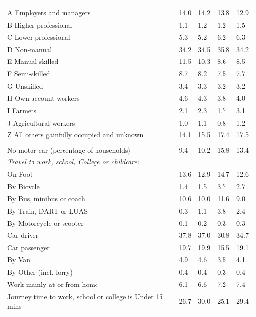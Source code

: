 \documentclass{article}
\begin{document}
\begin{table}[h]
\begin{tabular}{KTTTT}
\hline
    \\ 
    \hline
A Employers and managers & 14.0& 14.2& 13.8& 12.9\\
B Higher professional & 1.1& 1.2& 1.2& 1.5\\
C Lower professional & 5.3& 5.2& 6.2& 6.3\\
D Non-manual & 34.2& 34.5& 35.8& 34.2\\
E Manual skilled & 11.5& 10.3&  8.6&  8.5\\
F Semi-skilled & 8.7& 8.2& 7.5& 7.7\\
G Unskilled & 3.4& 3.3& 3.2& 3.2\\
H Own account workers & 4.6& 4.3& 3.8& 4.0\\
I Farmers & 2.1& 2.3& 1.7& 3.1\\
J Agricultural workers & 1.0& 1.1& 0.8& 1.2\\
Z All others gainfully occupied and unknown & 14.1& 15.5& 17.4& 17.5\\
\hline
{}\hline
    \\ 
    \hline
No motor car (percentage of households) &  9.4& 10.2& 15.8& 
13.4\\
    \hline 
\emph{Travel to work, school, College or childcare:} & & & \\
\quad On Foot & 13.6& 12.9& 14.7& 12.6\\ 
\quad By Bicycle & 1.4& 1.5& 3.7& 2.7\\ 
\quad By Bus, minibus or coach & 10.6& 10.0& 11.6&  9.0\\
\quad By Train, DART or LUAS & 0.3& 1.1& 3.8& 2.4\\
\quad By Motorcycle or scooter & 0.1& 0.2& 0.3& 0.3\\
\quad Car driver & 37.8 & 37.0& 30.8& 34.7\\
\quad Car passenger & 19.7& 19.9& 15.5& 19.1\\
\quad By Van & 4.9& 4.6& 3.5& 4.1\\
\quad By Other (incl. lorry) & 0.4& 0.4& 0.3& 0.4\\
    \hline
Work mainly at or from home & 6.1& 6.6& 7.2& 7.4\\
Journey time to work, school or college is Under 15 mins & 26.7& 30.0& 25.1& 29.4\\

\end{tabular}
\end{table}
\end{document}
